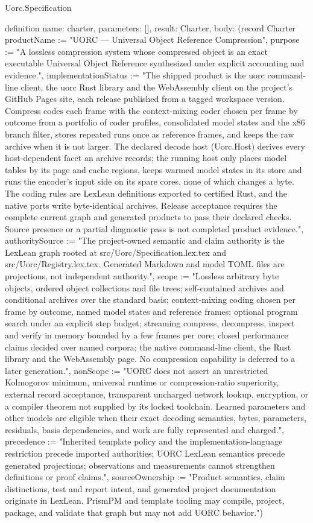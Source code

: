 \begin{lexlean}{Uorc.Specification}
\begin{semanticmodule}
definition{
  name: charter,
  parameters: [],
  result: Charter,
  body: (record Charter {productName := "UORC — Universal Object Reference Compression", purpose := "A lossless compression system whose compressed object is an exact executable Universal Object Reference synthesized under explicit accounting and evidence.", implementationStatus := "The shipped product is the uorc command-line client, the uorc Rust library and the WebAssembly client on the project's GitHub Pages site, each release published from a tagged workspace version. Compress codes each frame with the context-mixing coder chosen per frame by outcome from a portfolio of coder profiles, consolidated model states and the x86 branch filter, stores repeated runs once as reference frames, and keeps the raw archive when it is not larger. The declared decode host (Uorc.Host) derives every host-dependent facet an archive records; the running host only places model tables by its page and cache regions, keeps warmed model states in its store and runs the encoder's input side on its spare cores, none of which changes a byte. The coding rules are LexLean definitions exported to certified Rust, and the native ports write byte-identical archives. Release acceptance requires the complete current graph and generated products to pass their declared checks. Source presence or a partial diagnostic pass is not completed product evidence.", authoritySource := "The project-owned semantic and claim authority is the LexLean graph rooted at src/Uorc/Specification.lex.tex and src/Uorc/Registry.lex.tex. Generated Markdown and model TOML files are projections, not independent authority.", scope := "Lossless arbitrary byte objects, ordered object collections and file trees; self-contained archives and conditional archives over the standard basis; context-mixing coding chosen per frame by outcome, named model states and reference frames; optional program search under an explicit step budget; streaming compress, decompress, inspect and verify in memory bounded by a few frames per core; closed performance claims decided over named corpora; the native command-line client, the Rust library and the WebAssembly page. No compression capability is deferred to a later generation.", nonScope := "UORC does not assert an unrestricted Kolmogorov minimum, universal runtime or compression-ratio superiority, external record acceptance, transparent uncharged network lookup, encryption, or a compiler theorem not supplied by its locked toolchain. Learned parameters and other models are eligible when their exact decoding semantics, bytes, parameters, residuals, basis dependencies, and work are fully represented and charged.", precedence := "Inherited template policy and the implementation-language restriction precede imported authorities; UORC LexLean semantics precede generated projections; observations and measurements cannot strengthen definitions or proof claims.", sourceOwnership := "Product semantics, claim distinctions, test and report intent, and generated project documentation originate in LexLean. PrismPM and template tooling may compile, project, package, and validate that graph but may not add UORC behavior."})
}


\end{semanticmodule}
\end{lexlean}
